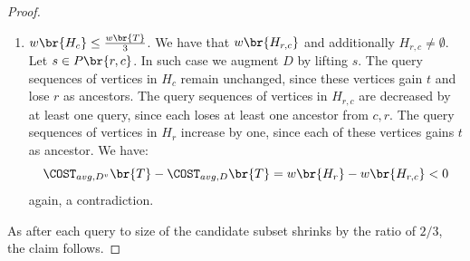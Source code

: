 \begin{theorem}
\begin{proof}
\begin{enumerate}
$$$$
thus, a contradiction.
\item $w\br{H_c}\leq \frac{w\br{T}}{3}$. We have that $w\br{H_{r, c}}$ and additionally $H_{r, c}\neq\emptyset$. Let $s\in P\br{r, c}$. In such case we augment $D$ by lifting $s$. The query sequences of vertices in
$H_{c}$ remain  unchanged, since these vertices gain $t$ and lose $r$ as ancestors. The query sequences of vertices in $H_{r,c}$ are
decreased by at least one query, since each loses at least one ancestor from ${c, r}$. The query sequences of
vertices in $H_r$ increase by one, since each of these vertices gains $t$ as ancestor. We have:
$$
\COST_{avg, D^v}\br{T}-\COST_{avg, D}\br{T}=w\br{H_r}-w\br{H_{r,c}}< 0
$$
again, a contradiction.
        \end{enumerate}
As after each query to size of the candidate subset shrinks by the ratio of $2/3$, the claim follows.
    \end{proof}
\end{theorem}

